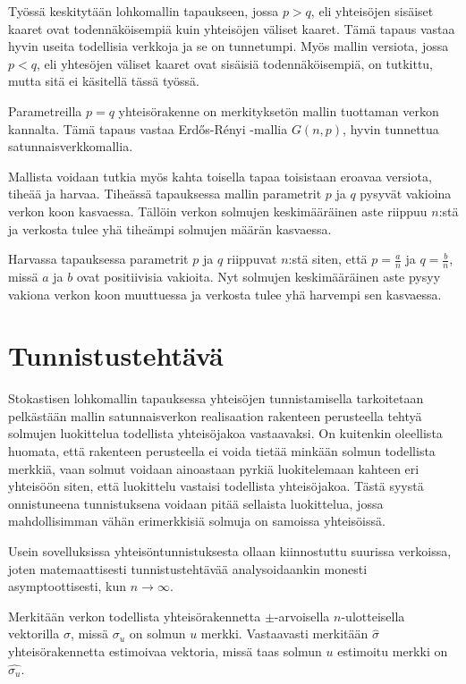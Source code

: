 \documentclass[finnish,12pt,a4paper,pdftex,sci,utf8]{aaltothesis}
\begin{document}
Työssä keskitytään lohkomallin tapaukseen, jossa $p > q$, eli yhteisöjen sisäiset kaaret ovat todennäköisempiä kuin yhteisöjen väliset kaaret. Tämä tapaus vastaa hyvin useita todellisia verkkoja ja se on tunnetumpi. Myös mallin versiota, jossa $p < q$, eli yhtesöjen väliset kaaret ovat sisäisiä todennäköisempiä, on tutkittu, mutta sitä ei käsitellä tässä työssä.

Parametreilla $p = q$ yhteisörakenne on merkityksetön mallin tuottaman verkon kannalta. Tämä tapaus vastaa Erdős-Rényi -mallia $G(n,p)$, hyvin tunnettua satunnaisverkkomallia.

Mallista voidaan tutkia myös kahta toisella tapaa toisistaan eroavaa versiota, tiheää ja harvaa. Tiheässä tapauksessa mallin parametrit $p$ ja $q$ pysyvät vakioina verkon koon kasvaessa. Tällöin verkon solmujen keskimääräinen aste riippuu $n$:stä ja verkosta tulee yhä tiheämpi solmujen määrän kasvaessa.

Harvassa tapauksessa parametrit $p$ ja $q$ riippuvat $n$:stä siten, että $p = \frac{a}{n}$ ja $q = \frac{b}{n}$, missä $a$ ja $b$ ovat positiivisia vakioita. Nyt solmujen keskimääräinen aste pysyy vakiona verkon koon muuttuessa ja verkosta tulee yhä harvempi sen kasvaessa.

\clearpage

\section{Tunnistustehtävä}

Stokastisen lohkomallin tapauksessa yhteisöjen tunnistamisella tarkoitetaan pelkästään mallin satunnaisverkon realisaation rakenteen perusteella tehtyä solmujen luokittelua todellista yhteisöjakoa vastaavaksi. On kuitenkin oleellista huomata, että rakenteen perusteella ei voida tietää minkään solmun todellista merkkiä, vaan solmut voidaan ainoastaan pyrkiä luokitelemaan kahteen eri yhteisöön siten, että luokittelu vastaisi todellista yhteisöjakoa. Tästä syystä onnistuneena tunnistuksena voidaan pitää sellaista luokittelua, jossa mahdollisimman vähän erimerkkisiä solmuja on samoissa yhteisöissä.

Usein sovelluksissa yhteisöntunnistuksesta ollaan kiinnostuttu suurissa verkoissa, joten matemaattisesti tunnistustehtävää analysoidaankin monesti asymptoottisesti, kun $n \rightarrow \infty$.

Merkitään verkon todellista yhteisörakennetta ${\pm}$-arvoisella $n$-ulotteisella vektorilla $\sigma$, missä $\sigma_u$ on solmun $u$ merkki. Vastaavasti merkitään $\hat{\sigma}$ yhteisörakennetta estimoivaa vektoria, missä taas solmun $u$ estimoitu merkki on $\hat{\sigma_u}$.
\end{document}
